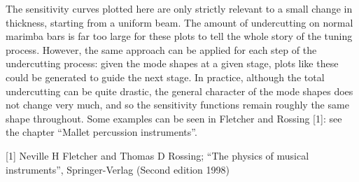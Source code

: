   The sensitivity curves plotted here are only strictly relevant to a small 
  change in thickness, starting from a uniform beam. The amount of undercutting 
  on normal marimba bars is far too large for these plots to tell the whole 
  story of the tuning process. However, the same approach can be applied for 
  each step of the undercutting process: given the mode shapes at a given 
  stage, plots like these could be generated to guide the next stage. In 
  practice, although the total undercutting can be quite drastic, the general 
  character of the mode shapes does not change very much, and so the 
  sensitivity functions remain roughly the same shape throughout. Some examples 
  can be seen in Fletcher and Rossing [1]: see the chapter ``Mallet percussion 
  instruments''. 



  \sectionreferences{}[1] Neville H Fletcher and Thomas D Rossing; ``The 
  physics of musical instruments'', Springer-Verlag (Second edition 1998) 